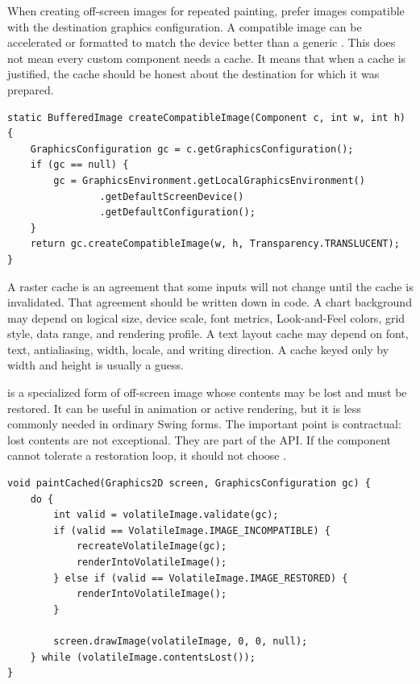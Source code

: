When creating off-screen images for repeated painting, prefer images compatible with the destination graphics configuration. A compatible image can be accelerated or formatted to match the device better than a generic . This does not mean every custom component needs a cache. It means that when a cache is justified, the cache should be honest about the destination for which it was prepared.

\begin{lstlisting}[caption={Creating a compatible translucent image.}]
static BufferedImage createCompatibleImage(Component c, int w, int h) {
    GraphicsConfiguration gc = c.getGraphicsConfiguration();
    if (gc == null) {
        gc = GraphicsEnvironment.getLocalGraphicsEnvironment()
                .getDefaultScreenDevice()
                .getDefaultConfiguration();
    }
    return gc.createCompatibleImage(w, h, Transparency.TRANSLUCENT);
}
\end{lstlisting}

A raster cache is an agreement that some inputs will not change until the cache is invalidated. That agreement should be written down in code. A chart background may depend on logical size, device scale, font metrics, Look-and-Feel colors, grid style, data range, and rendering profile. A text layout cache may depend on font, text, antialiasing, width, locale, and writing direction. A cache keyed only by width and height is usually a guess.

 is a specialized form of off-screen image whose contents may be lost and must be restored. It can be useful in animation or active rendering, but it is less commonly needed in ordinary Swing forms. The important point is contractual: lost contents are not exceptional. They are part of the API. If the component cannot tolerate a restoration loop, it should not choose .

\begin{lstlisting}[caption={The essential VolatileImage validation loop.}]
void paintCached(Graphics2D screen, GraphicsConfiguration gc) {
    do {
        int valid = volatileImage.validate(gc);
        if (valid == VolatileImage.IMAGE_INCOMPATIBLE) {
            recreateVolatileImage(gc);
            renderIntoVolatileImage();
        } else if (valid == VolatileImage.IMAGE_RESTORED) {
            renderIntoVolatileImage();
        }

        screen.drawImage(volatileImage, 0, 0, null);
    } while (volatileImage.contentsLost());
}
\end{lstlisting}

